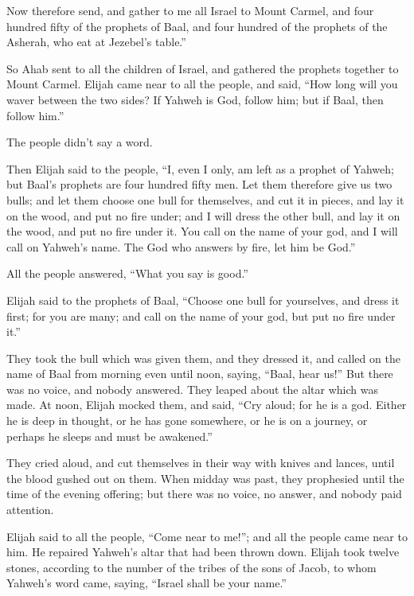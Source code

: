 {Now therefore send, and gather to me all Israel to Mount Carmel, and four hundred fifty of the prophets of Baal, and four hundred of the prophets of the Asherah, who eat at Jezebel’s table.”
\par }{\PP {}So Ahab sent to all the children of Israel, and gathered the prophets together to Mount Carmel.
Elijah came near to all the people, and said, “How long will you waver between the two sides? If Yahweh is God, follow him; but if Baal, then follow him.”
\par }{\PP The people didn’t say a word.
\par }{\PP {}Then Elijah said to the people, “I, even I only, am left as a prophet of Yahweh; but Baal’s prophets are four hundred fifty men.
Let them therefore give us two bulls; and let them choose one bull for themselves, and cut it in pieces, and lay it on the wood, and put no fire under; and I will dress the other bull, and lay it on the wood, and put no fire under it.
You call on the name of your god, and I will call on Yahweh’s name. The God who answers by fire, let him be God.”
\par }{\PP All the people answered, “What you say is good.”
\par }{\PP {}Elijah said to the prophets of Baal, “Choose one bull for yourselves, and dress it first; for you are many; and call on the name of your god, but put no fire under it.”
\par }{\PP {}They took the bull which was given them, and they dressed it, and called on the name of Baal from morning even until noon, saying, “Baal, hear us!” But there was no voice, and nobody answered. They leaped about the altar which was made.
At noon, Elijah mocked them, and said, “Cry aloud; for he is a god. Either he is deep in thought, or he has gone somewhere, or he is on a journey, or perhaps he sleeps and must be awakened.”
\par }{\PP {}They cried aloud, and cut themselves in their way with knives and lances, until the blood gushed out on them.
When midday was past, they prophesied until the time of the evening offering; but there was no voice, no answer, and nobody paid attention.
\par }{\PP {}Elijah said to all the people, “Come near to me!”; and all the people came near to him. He repaired Yahweh’s altar that had been thrown down.
Elijah took twelve stones, according to the number of the tribes of the sons of Jacob, to whom Yahweh’s word came, saying, “Israel shall be your name.”
}

